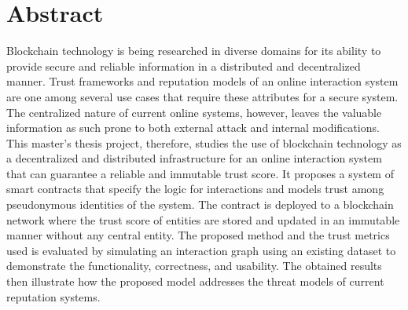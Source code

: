 \chapter*{Abstract}
Blockchain technology is being researched in diverse domains for its ability to
provide secure and reliable information in a distributed and decentralized
manner. Trust frameworks and reputation models of an online interaction system
are one among several use cases that require these attributes for a secure
system. The centralized nature of current online systems, however, leaves the
valuable information as such prone to both external attack and internal
modifications. This master's thesis project, therefore, studies the use of
blockchain technology as a decentralized and distributed infrastructure for an
online interaction system that can guarantee a reliable and immutable trust
score. It proposes a system of smart contracts that specify the logic for
interactions and models trust among pseudonymous identities of the system. The
contract is deployed to a blockchain network where the trust score of entities
are stored and updated in an immutable manner without any central entity. The
proposed method and the trust metrics used is evaluated by simulating an
interaction graph using an existing dataset to demonstrate the functionality,
correctness, and usability. The obtained results then illustrate how the
proposed model addresses the threat models of current reputation systems.



